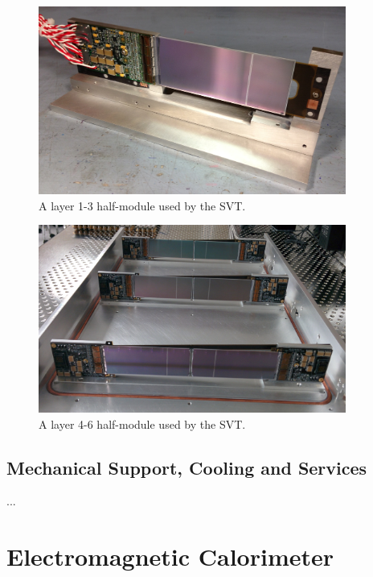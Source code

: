 \begin{figure}
    \centering
    \includegraphics[width=0.9\textwidth]{images/l13_half_module.jpg}
    \caption{A layer 1-3 half-module used by the SVT. }
    \label{fig:l13_hm}
\end{figure}
\begin{figure}
    \centering
    \includegraphics[width=0.9\textwidth]{images/l46_half_module.jpg}
    \caption{A layer 4-6 half-module used by the SVT. }
    \label{fig:l46_hm}
\end{figure}


\subsection{Mechanical Support, Cooling and Services}

...


\section{Electromagnetic Calorimeter}

